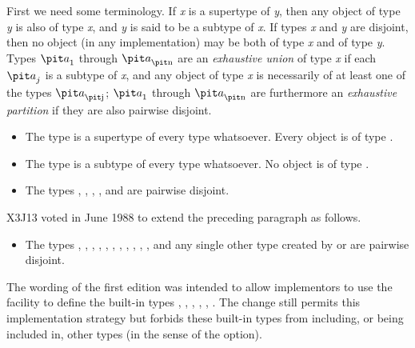 First we need some terminology.
If {\it x} is a supertype of {\it y}, then any object of type {\it y} is also
of type {\it x}, and {\it y} is said to be a subtype of {\it x}.  If types
{\it x} and {\it y} are disjoint, then no object (in any implementation) may
be both of type {\it x} and of type {\it y}.  Types ${\it a}_1$ through
${\it a}_{\hbox{\scriptsize\it n}}$ are an {\it exhaustive union}
of type {\it x} if each ${\it a}_j$
is a subtype of {\it x}, and any object of type {\it x} is
necessarily of at least one of the types ${\it a}_{\hbox{\scriptsize\it j}}$;
${\it a}_1$ through ${\it a}_{\hbox{\scriptsize\it n}}$ are furthermore an {\it exhaustive partition}
if they are also pairwise disjoint.

\begin{itemize}
\item
The type  is a supertype of every type whatsoever.
Every object is of type .

\item
The type {\nil} is a subtype of every type whatsoever.
No object is of type {\nil}.
\end{itemize}

\begin{obsolete}
\begin{itemize}
\item
The types , , , , and 
are pairwise disjoint.
\end{itemize}
\end{obsolete}

\begin{new}
X3J13 voted in June 1988
to extend the preceding paragraph as follows.

\begin{itemize}
\item
The types , , , , ,
, , , ,
, , and any single other type created by
 or 
are pairwise disjoint.
\end{itemize}

The wording of the first edition was intended to allow implementors to use
the  facility to define the built-in types ,
, , , , .
The change still permits this implementation strategy but
forbids these built-in types from including, or being included in,
other types (in the sense of the   option).
\end{new}

